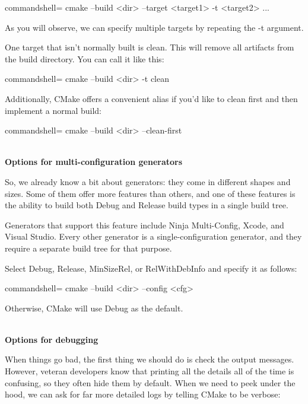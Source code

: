 \begin{tcblisting}{commandshell={}}
cmake --build <dir> --target <target1> -t <target2> ...
\end{tcblisting}

As you will observe, we can specify multiple targets by repeating the -t argument.

One target that isn't normally built is clean. This will remove all artifacts from the build directory. You can call it like this:

\begin{tcblisting}{commandshell={}}
cmake --build <dir> -t clean
\end{tcblisting}

Additionally, CMake offers a convenient alias if you'd like to clean first and then implement a normal build:

\begin{tcblisting}{commandshell={}}
cmake --build <dir> --clean-first
\end{tcblisting}

\hspace*{\fill} \\ %
\noindent
\textbf{Options for multi-configuration generators}

So, we already know a bit about generators: they come in different shapes and sizes. Some of them offer more features than others, and one of these features is the ability to build both Debug and Release build types in a single build tree.

Generators that support this feature include Ninja Multi-Config, Xcode, and Visual Studio. Every other generator is a single-configuration generator, and they require a separate build tree for that purpose.

Select Debug, Release, MinSizeRel, or RelWithDebInfo and specify it as follows:

\begin{tcblisting}{commandshell={}}
cmake --build <dir> --config <cfg>
\end{tcblisting}

Otherwise, CMake will use Debug as the default.

\hspace*{\fill} \\ %
\noindent
\textbf{Options for debugging}

When things go bad, the first thing we should do is check the output messages. However, veteran developers know that printing all the details all of the time is confusing, so they often hide them by default. When we need to peek under the hood, we can ask for far more detailed logs by telling CMake to be verbose:

